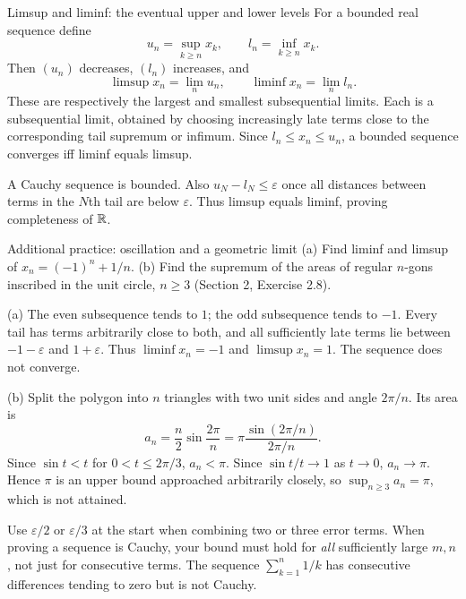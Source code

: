 \begin{note}{Limsup and liminf: the eventual upper and lower levels}
For a bounded real sequence define
\[u_n=\sup_{k\ge n}x_k,\qquad l_n=\inf_{k\ge n}x_k.\]
Then $(u_n)$ decreases, $(l_n)$ increases, and
\[\limsup x_n=\lim_nu_n,\qquad\liminf x_n=\lim_nl_n.\]
These are respectively the largest and smallest subsequential limits. Each is a subsequential limit, obtained by choosing increasingly late terms close to the corresponding tail supremum or infimum. Since $l_n\le x_n\le u_n$, a bounded sequence converges iff liminf equals limsup.

A Cauchy sequence is bounded. Also $u_N-l_N\le\varepsilon$ once all distances between terms in the $N$th tail are below $\varepsilon$. Thus limsup equals liminf, proving completeness of $\mathbb R$.
\end{note}
\begin{exam}{Additional practice: oscillation and a geometric limit}
(a) Find liminf and limsup of $x_n=(-1)^n+1/n$. (b) Find the supremum of the areas of regular $n$-gons inscribed in the unit circle, $n\ge3$ (Section 2, Exercise 2.8).
\end{exam}
\begin{answer}
(a) The even subsequence tends to $1$; the odd subsequence tends to $-1$. Every tail has terms arbitrarily close to both, and all sufficiently late terms lie between $-1-\varepsilon$ and $1+\varepsilon$. Thus $\liminf x_n=-1$ and $\limsup x_n=1$. The sequence does not converge.

(b) Split the polygon into $n$ triangles with two unit sides and angle $2\pi/n$. Its area is
\[a_n=\frac n2\sin\frac{2\pi}{n}=\pi\frac{\sin(2\pi/n)}{2\pi/n}.\]
Since $\sin t<t$ for $0<t\le2\pi/3$, $a_n<\pi$. Since $\sin t/t\to1$ as $t\to0$, $a_n\to\pi$. Hence $\pi$ is an upper bound approached arbitrarily closely, so $\sup_{n\ge3}a_n=\pi$, which is not attained.
\end{answer}
\begin{tip}
Use $\varepsilon/2$ or $\varepsilon/3$ at the start when combining two or three error terms. When proving a sequence is Cauchy, your bound must hold for \emph{all} sufficiently large $m,n$, not just for consecutive terms. The sequence $\sum_{k=1}^n1/k$ has consecutive differences tending to zero but is not Cauchy.
\end{tip}


